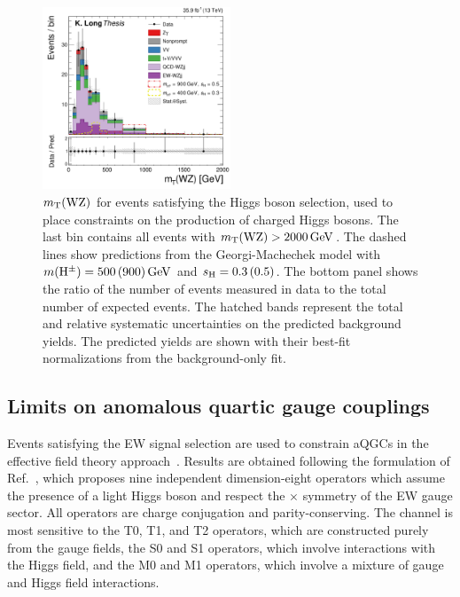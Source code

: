 \begin{figure}[htbp]
  \centering
    \includegraphics[width=0.5\textwidth]{figures/AnalysisProcedure/MTWZ_Higgs_expected.pdf}
  \caption{
      $m_{\mathrm{T}}(\mathrm{W}\mathrm{Z})$ for events satisfying the Higgs boson selection,
      used to place constraints on the production of charged Higgs bosons.
      The last bin contains all events with $m_{\mathrm{T}}(\mathrm{W}\mathrm{Z}) > 2000\,\text{Ge\hspace{-.08em}V}$.
      The dashed lines show predictions from the Georgi-Machechek model with
      $m(\mathrm{H}^{\pm}) = 500 \,(900)\,\text{Ge\hspace{-.08em}V}$ and $s_{\mathrm{H}} = 0.3 \,(0.5)$.
      The bottom panel shows the ratio of the number of events measured in data to the total 
      number of expected events. The hatched bands represent the total and relative 
      systematic uncertainties on the predicted background yields.
      The predicted yields are shown with their best-fit normalizations from the background-only fit.
      }
 \label{fig:higgsmtExp}
\end{figure}

\subsection{Limits on anomalous quartic gauge couplings}

Events satisfying the EW signal selection are used to constrain aQGCs in the effective field theory approach~\cite{Degrande:2012wf}.
Results are obtained following the formulation of Ref.~\cite{Eboli:2006wa}, which proposes
nine independent dimension-eight operators which assume the presence of a light Higgs boson and 
respect the {\SUtwo$\times$\Uone} symmetry of the EW gauge sector. All operators are
charge conjugation and parity-conserving.
The \WZjj channel is most sensitive to the 
T0, T1, and T2 operators, which are constructed purely from the {\SUtwo} gauge fields,
the S0 and S1 operators, which involve interactions with the Higgs field,
and the M0 and M1 operators, which involve a mixture of gauge and Higgs field interactions.

